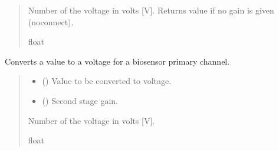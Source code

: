 \documentclass[letterpaper,10pt,english]{sphinxmanual}
\begin{document}
\begin{fulllineitems}
\begin{fulllineitems}
\begin{quote}
\begin{description}
\sphinxAtStartPar
Number of the voltage in volts {[}V{]}. Returns value if no gain is given (no\sphinxhyphen{}connect).

\sphinxAtStartPar
float

\end{description}\end{quote}

\end{fulllineitems}


\begin{fulllineitems}
\label{\detokenize{PodApi.Packets:PodApi.Packets.Binary5.PacketBinary5._Voltage_PrimaryChannels_Biosensor}}
\pysigstartsignatures
{}
\pysigstopsignatures
\sphinxAtStartPar
Converts a value to a voltage for a biosensor primary channel.
\begin{quote}\begin{description}
\begin{itemize}
\item {} 
\sphinxAtStartPar
{} () \textendash{} Value to be converted to voltage.

\item {} 
\sphinxAtStartPar
{} () \textendash{} Second stage gain.

\end{itemize}

\sphinxAtStartPar
Number of the voltage in volts {[}V{]}.

\sphinxAtStartPar
float

\end{description}\end{quote}

\end{fulllineitems}


\end{fulllineitems}
\end{document}
